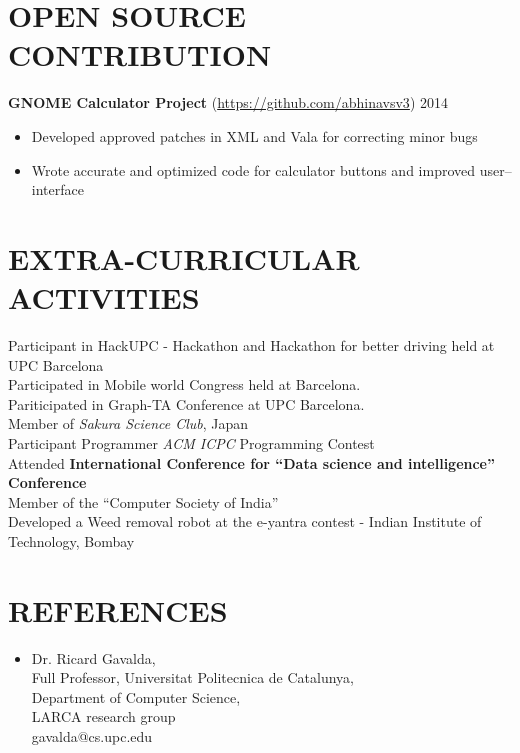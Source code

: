 \documentclass[margin, 10pt]{res} %
\begin{document}
\begin{resume}
{{{{\section{OPEN SOURCE CONTRIBUTION} \textbf{GNOME Calculator Project} (\url{https://github.com/abhinavsv3}) \hfill 2014
\begin{itemize} \itemsep -2pt %
\item Developed approved patches in XML and Vala for correcting minor bugs
\item Wrote accurate and optimized code for calculator buttons and improved user--interface
\end{itemize}
\section{EXTRA-CURRICULAR \\ ACTIVITIES} 
Participant in HackUPC - Hackathon and Hackathon for better driving held at UPC Barcelona\\
Participated in Mobile world Congress held at Barcelona.\\
Pariticipated in Graph-TA Conference at UPC Barcelona.\\
Member of {\it Sakura Science Club}, Japan\\
Participant Programmer {\it ACM ICPC} Programming Contest \\
Attended \textbf{International Conference for ``Data science and intelligence''  Conference} \\
Member of the ``Computer Society of India'' \\
Developed a Weed removal robot at the e-yantra contest - Indian Institute of Technology, Bombay \\

\section{REFERENCES}
\begin{itemize}
\item Dr. Ricard Gavalda, \\ Full Professor, Universitat Politecnica de Catalunya,\\
Department of Computer Science, \\LARCA research group\\gavalda@cs.upc.edu


\end{itemize}}}}}
\end{resume}
\end{document}

